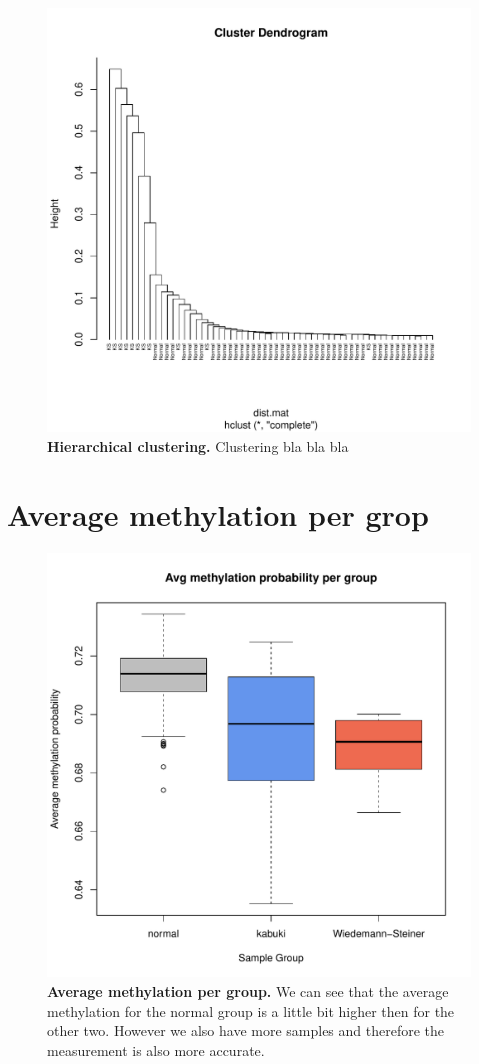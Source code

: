\begin{figure}[!h]
    \begin{centering}
    \includegraphics[width=0.7\columnwidth]{figures/hclust.pdf} 
    \caption[Hierachical clustering]{\textbf{Hierarchical clustering.} Clustering bla bla bla}    
    \label{fig:hclust}
    \end{centering}
\end{figure}


\section{Average methylation per grop}

\begin{figure}[!h]
    \begin{centering}
    \includegraphics[width=0.7\columnwidth]{figures/avg_met_per_group.pdf} 
    \caption[Average methylation per sample group]{\textbf{Average methylation per group.} We can see that the average methylation for the normal group is a little bit higher then for the other two. However we also have more samples and therefore the measurement is also more accurate.}    
    \label{fig:hclust}
    \end{centering}
\end{figure}

